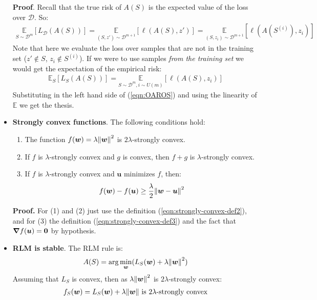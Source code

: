 \documentclass[../template.tex]{subfiles}
\begin{document}
\begin{itemize}
    \textbf{Proof}. Recall that the true risk of $A(S)$ is the expected value of the loss over $\mathcal{D}$. So:
    \begin{align*}
        \underset{{S \sim \mathcal{D}^m}}{\mathbb{E}}  [L_{\mathcal{D}}(A(S))] = \underset{(S,z') \sim \mathcal{D}^{m+1}}{\mathbb{E}}[\ell(A(S), z')] = \underset{{(S,z_i) \sim \mathcal{D}^{m+1}}}{\mathbb{E}} [\ell(A(S^{(i)}), z_i)]
    \end{align*}
    Note that here we evaluate the loss over samples that are not in the training set ($z' \not\in S$, $z_i \not\in S^{(i)}$). If we were to use samples \textit{from the training set} we would get the expectation of the empirical risk:
    \begin{align*}
        \mathbb{E}_{S}[L_S(A(S))] = \underset{S \sim \mathcal{D}^m, i \sim U(m)}{\mathbb{E}} [\ell(A(S), z_i)]
    \end{align*}
    Substituting in the left hand side of (\ref{eqn:OAROS}) and using the linearity of $\mathbb{E}$ we get the thesis.
    \item \textbf{Strongly convex functions}. The following conditions hold:
    \begin{enumerate}
        \item The function $f(\bm{w}) = \lambda \norm{\bm{w}}^2 $ is $2\lambda$-strongly convex.
        \item If $f$ is $\lambda$-strongly convex and $g$ is convex, then $f+g$ is $\lambda$-strongly convex.
        \item If $f$ is $\lambda$-strongly convex and $\bm{u}$ minimizes $f$, then:
        \begin{align*}
            f(\bm{w}) - f(\bm{u}) \geq \frac{\lambda}{2} \norm{\bm{w}- \bm{u}}^2 
        \end{align*}
    \end{enumerate}
    \textbf{Proof.} For (1) and (2) just use the definition (\ref{eqn:strongly-convex-def2}), and for (3) the definition (\ref{eqn:strongly-convex-def3}) and the fact that $\grad f(\bm{u}) = \bm{0}$ by hypothesis.
    \item \textbf{RLM is stable}. The RLM rule is:
    \begin{align*}
        A(S) = \arg\min_{\bm{w}} (L_S(\bm{w}) + \lambda \norm{\bm{w}}^2)
    \end{align*}
    Assuming that $L_S$ is convex, then as $\lambda \norm{\bm{w}}^2$ is $2\lambda$-strongly convex:
    \begin{align*}
        f_S(\bm{w}) = L_S(\bm{w}) + \lambda \norm{\bm{w}} \text{ is $2\lambda$-strongly convex}

\end{align*}
\end{itemize}
\end{document}
